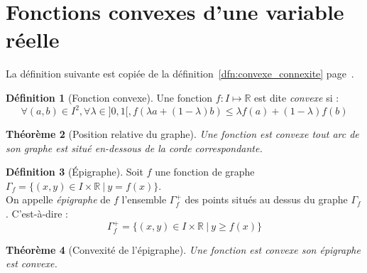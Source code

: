 \documentclass[11pt,a4paper]{report}
\newtheorem{theorem}{Théorème}[chapter]
\theoremstyle{definition}
\newtheorem{dfn}[theorem]{Définition}
\begin{document}
\section{Fonctions convexes d'une variable réelle} %
\label{sec:fonctions_convexes_d_une_variable_reelle}
La définition suivante est copiée de la définition~\ref{dfn:convexe_connexite} page~\pageref{dfn:convexe_connexite}.
\begin{dfn}[Fonction convexe]
   \begin{minipage}{0.75\textwidth}
    Une fonction $f : I \mapsto \ensuremath{\mathbb{R}}$ est dite \emph{convexe} si :
   \begin{equation}
   \forall (a,b) \in I^2, \forall \lambda  \in ]0,1[, \boxed{f(\lambda a + (1-\lambda )b) \le \lambda f(a) + (1-\lambda )f(b)}
   \end{equation}
    \end{minipage}\hspace{2mm}
    \begin{minipage}{0.2\textwidth}
    \end{minipage}
\end{dfn}
\begin{theorem}[Position relative du graphe]
     Une fonction est convexe \Longleftrightarrow tout arc de son graphe est situé en-dessous de la corde correspondante.
\end{theorem}
\begin{dfn}[Épigraphe]
     Soit $f$ une fonction de graphe $\Gamma_f = \{ (x,y)\in I\times \ensuremath{\mathbb{R}} \: |\: y = f(x)\}$.\\
     On appelle \emph{épigraphe} de $f$ l'ensemble $\Gamma_f^+$ des points situés au dessus du graphe $\Gamma_f$. C'est-à-dire : 
     \begin{equation}
     \Gamma_f^+ = \{ (x,y)\in I\times\ensuremath{\mathbb{R}} \: |\: y\ge f(x) \}
     \end{equation}
\end{dfn}
\begin{theorem}[Convexité de l'épigraphe]
     Une fonction est convexe \Longleftrightarrow son épigraphe est convexe.
\end{theorem}
\end{document}
